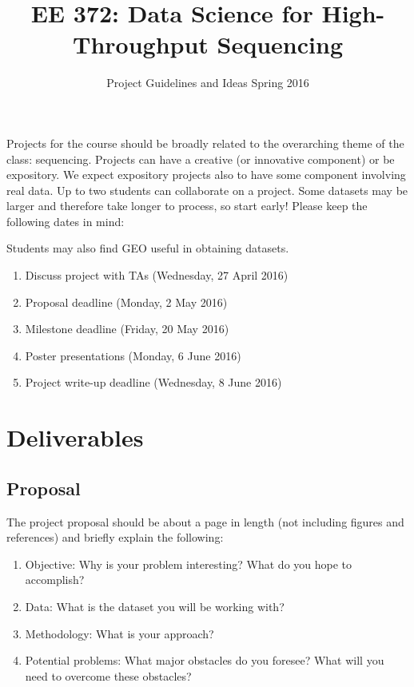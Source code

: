 \documentclass[11pt,onecolumn]{article}
\title{EE 372: Data Science for High-Throughput Sequencing}
\author{Project Guidelines and Ideas Spring 2016}
\date{\vspace{-5ex}}
\begin{document}
\maketitle

Projects for the course should be broadly related to the overarching theme of the class: sequencing.
Projects can have a creative (or innovative component) or be expository. We expect
expository projects also to have some component involving real data.
Up to two students can collaborate on a project. Some datasets may be larger
and therefore take longer to process, so start early! Please keep the following dates in mind:

Students may also find GEO useful in obtaining datasets.

\begin{enumerate}
	\item Discuss project with TAs (Wednesday, 27 April 2016)
	\item Proposal deadline (Monday, 2 May 2016)
	\item Milestone deadline (Friday, 20 May 2016)
	\item Poster presentations (Monday, 6 June 2016)
	\item Project write-up deadline (Wednesday, 8 June 2016)
\end{enumerate}

\section{Deliverables}

\subsection{Proposal}
The project proposal should be about a page in length (not including figures and references) and briefly explain the following:
\begin{enumerate}
	\item Objective: Why is your problem interesting? What do you hope to accomplish?
	\item Data: What is the dataset you will be working with? 
	\item Methodology: What is your approach?
	\item Potential problems: What major obstacles do you foresee? What will you need to overcome these obstacles?
\end{enumerate}
\end{document}
